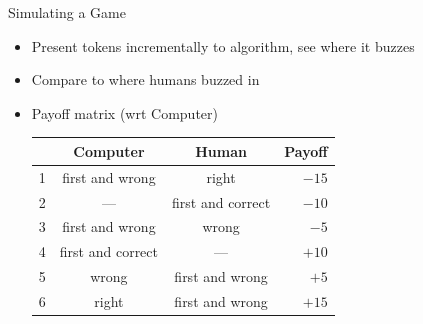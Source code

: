 \documentclass[compress]{beamer}
\begin{document}
\begin{frame}{Simulating a Game}
		\begin{itemize}
			\item Present tokens incrementally to algorithm, see where it buzzes
			\item Compare to where humans buzzed in
			\item Payoff matrix (wrt Computer)
			\begin{center}
\begin{tabular}{lccr}
& Computer & Human & Payoff \\
\hline
1 & first and wrong & right & $-15$ \\
2 & --- & first and correct & $-10$ \\
3  & first and wrong & wrong & $-5$ \\
4 & first and correct & --- & $+10$ \\
5 & wrong & first and wrong & $+5$ \\
6 & right & first and wrong & $+15$ \\
\hline
\end{tabular}
			\end{center}
		\end{itemize}
\end{frame}
\end{document}
